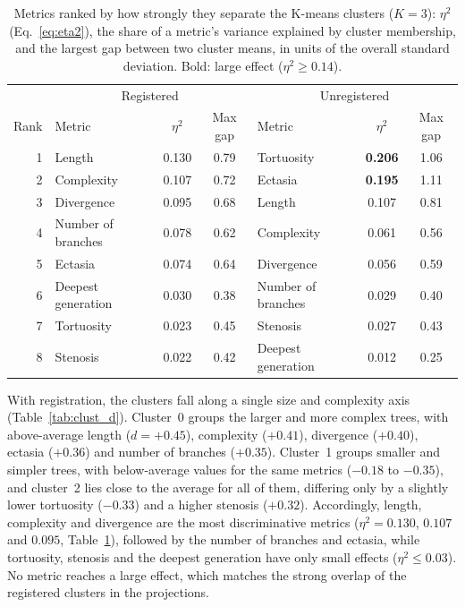 \begin{table}[htbp]                      %
  \centering
  \small
  \caption{Metrics ranked by how strongly they separate the K-means clusters ($K=3$): $\eta^2$
           (Eq.~\eqref{eq:eta2}), the share of a metric's variance explained by cluster
           membership, and the largest gap between two cluster means, in units of the overall
           standard deviation. Bold: large effect ($\eta^2 \ge 0.14$).}
  \label{tab:clust_eta2}
  \begin{tabular}{rlcc|lcc}
    \toprule
    & \multicolumn{3}{c|}{Registered} & \multicolumn{3}{c}{Unregistered} \\
    Rank & Metric & $\eta^2$ & Max gap & Metric & $\eta^2$ & Max gap \\
    \midrule
    1 & Length & 0.130 & 0.79 & Tortuosity & \textbf{0.206} & 1.06 \\
    2 & Complexity & 0.107 & 0.72 & Ectasia & \textbf{0.195} & 1.11 \\
    3 & Divergence & 0.095 & 0.68 & Length & 0.107 & 0.81 \\
    4 & Number of branches & 0.078 & 0.62 & Complexity & 0.061 & 0.56 \\
    5 & Ectasia & 0.074 & 0.64 & Divergence & 0.056 & 0.59 \\
    6 & Deepest generation & 0.030 & 0.38 & Number of branches & 0.029 & 0.40 \\
    7 & Tortuosity & 0.023 & 0.45 & Stenosis & 0.027 & 0.43 \\
    8 & Stenosis & 0.022 & 0.42 & Deepest generation & 0.012 & 0.25 \\
    \bottomrule
  \end{tabular}
\end{table}

With registration, the clusters fall along a single size and complexity axis
(Table~\ref{tab:clust_d}). Cluster~0 groups the larger and more complex trees, with
above-average length ($d = +0.45$), complexity ($+0.41$), divergence ($+0.40$), ectasia
($+0.36$) and number of branches ($+0.35$). Cluster~1 groups smaller and simpler trees, with
below-average values for the same metrics ($-0.18$ to $-0.35$), and cluster~2 lies close to the
average for all of them, differing only by a slightly lower tortuosity ($-0.33$) and a higher
stenosis ($+0.32$). Accordingly, length, complexity and divergence are the most discriminative
metrics ($\eta^2 = 0.130$, $0.107$ and $0.095$, Table~\ref{tab:clust_eta2}), followed by the
number of branches and ectasia, while tortuosity, stenosis and the deepest generation have only
small effects ($\eta^2 \le 0.03$). No metric reaches a large effect, which matches the strong
overlap of the registered clusters in the projections.

